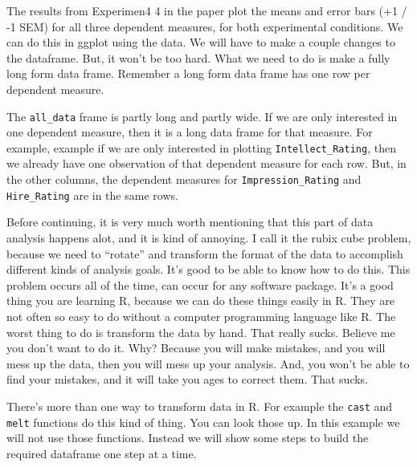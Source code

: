 \documentclass[]{book}
\theoremstyle{definition}
\theoremstyle{definition}
\theoremstyle{definition}
\theoremstyle{remark}
\begin{document}
The results from Experimen4 4 in the paper plot the means and error bars
(+1 / -1 SEM) for all three dependent measures, for both experimental
conditions. We can do this in ggplot using the data. We will have to
make a couple changes to the dataframe. But, it won't be too hard. What
we need to do is make a fully long form data frame. Remember a long form
data frame has one row per dependent measure.

The \texttt{all\_data} frame is partly long and partly wide. If we are
only interested in one dependent measure, then it is a long data frame
for that measure. For example, example if we are only interested in
plotting \texttt{Intellect\_Rating}, then we already have one
observation of that dependent measure for each row. But, in the other
columns, the dependent measures for \texttt{Impression\_Rating} and
\texttt{Hire\_Rating} are in the same rows.

Before continuing, it is very much worth mentioning that this part of
data analysis happens alot, and it is kind of annoying. I call it the
rubix cube problem, because we need to ``rotate'' and transform the
format of the data to accomplish different kinds of analysis goals. It's
good to be able to know how to do this. This problem occurs all of the
time, can occur for any software package. It's a good thing you are
learning R, because we can do these things easily in R. They are not
often so easy to do without a computer programming language like R. The
worst thing to do is transform the data by hand. That really sucks.
Believe me you don't want to do it. Why? Because you will make mistakes,
and you will mess up the data, then you will mess up your analysis. And,
you won't be able to find your mistakes, and it will take you ages to
correct them. That sucks.

There's more than one way to transform data in R. For example the
\texttt{cast} and \texttt{melt} functions do this kind of thing. You can
look those up. In this example we will not use those functions. Instead
we will show some steps to build the required dataframe one step at a
time.
\end{document}
